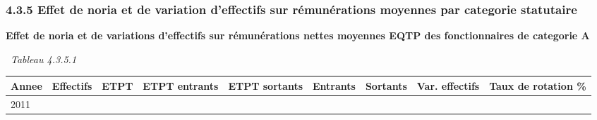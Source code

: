\hypertarget{effet-de-noria-et-de-variation-deffectifs-sur-remunerations-moyennes-par-categorie-statutaire}{%
\subsubsection{4.3.5 Effet de noria et de variation d'effectifs sur
rémunérations moyennes par categorie
statutaire}\label{effet-de-noria-et-de-variation-deffectifs-sur-remunerations-moyennes-par-categorie-statutaire}}

\textbf{Effet de noria et de variations d'effectifs sur rémunérations
nettes moyennes EQTP des fonctionnaires de categorie A}

~\emph{Tableau 4.3.5.1}

\begin{longtable}[]{@{}lllllllll@{}}
\toprule
\begin{minipage}[b]{0.05\columnwidth}\raggedright
Annee\strut
\end{minipage} & \begin{minipage}[b]{0.08\columnwidth}\raggedright
Effectifs\strut
\end{minipage} & \begin{minipage}[b]{0.05\columnwidth}\raggedright
ETPT\strut
\end{minipage} & \begin{minipage}[b]{0.10\columnwidth}\raggedright
ETPT entrants\strut
\end{minipage} & \begin{minipage}[b]{0.10\columnwidth}\raggedright
ETPT sortants\strut
\end{minipage} & \begin{minipage}[b]{0.07\columnwidth}\raggedright
Entrants\strut
\end{minipage} & \begin{minipage}[b]{0.07\columnwidth}\raggedright
Sortants\strut
\end{minipage} & \begin{minipage}[b]{0.11\columnwidth}\raggedright
Var. effectifs\strut
\end{minipage} & \begin{minipage}[b]{0.14\columnwidth}\raggedright
Taux de rotation \%\strut
\end{minipage}\tabularnewline
\midrule
\endhead
\begin{minipage}[t]{0.05\columnwidth}\raggedright
2011\strut
\end{minipage} & \begin{minipage}[t]{0.08\columnwidth}\raggedright

\end{minipage}
\end{longtable}
